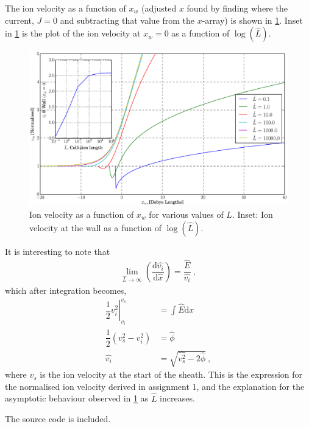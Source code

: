 \documentclass[10pt,a4paper]{article}
\begin{document}
	The ion velocity as a function of $x_{w}$ (adjusted $x$ found by finding where the current, $J = 0$ and subtracting that value from the $x$-array) is shown in \cref{fig:1}. Inset in \cref{fig:1} is the plot of the ion velocity at $x_{w} = 0$ as a function of $\log\left(\hat{L}\right)$.
	\begin{figure}
		\includegraphics[width=\textwidth]{collisions.eps}
		\caption{Ion velocity as a function of $x_{w}$ for various values of $L$. Inset: Ion velocity at the wall as a function of $\log\left(\hat{L}\right)$.}
		\label{fig:1}
	\end{figure}
	It is interesting to note that 
	\begin{align}
		\lim\limits_{\hat{L} \rightarrow \infty} \left(\dfrac{\mathrm{d} \hat{v_{i}}}{\mathrm{d} \hat{x}} \right) = \dfrac{\hat{E}}{\hat{v_{i}}}~,
	\end{align}
	which after integration becomes,
	\begin{align}
		\left. \dfrac{1}{2} v_{i}^{2} \right|_{v_{i}}^{v_{s}} &= \int\hat{E}\mathrm{d}x \nonumber\\
		\dfrac{1}{2} \left(v_{s}^{2} - v_{i}^{2}\right) &= \hat{\phi}\\
		\hat{v_{i}} &= \sqrt{\hat{v_{s}^{2}} - 2 \hat{\phi}}~,
	\end{align}
	where $v_{s}$ is the ion velocity at the start of the sheath. This is the expression for the normalised ion velocity derived in assignment 1, and the explanation for the asymptotic behaviour observed in \cref{fig:1} as $\hat{L}$ increases.
	
	The source code is included.
	\inputminted[linenos = true,
	breaklines, 
	breakanywhere]{python}{dcg513_3.py}
\end{document}
